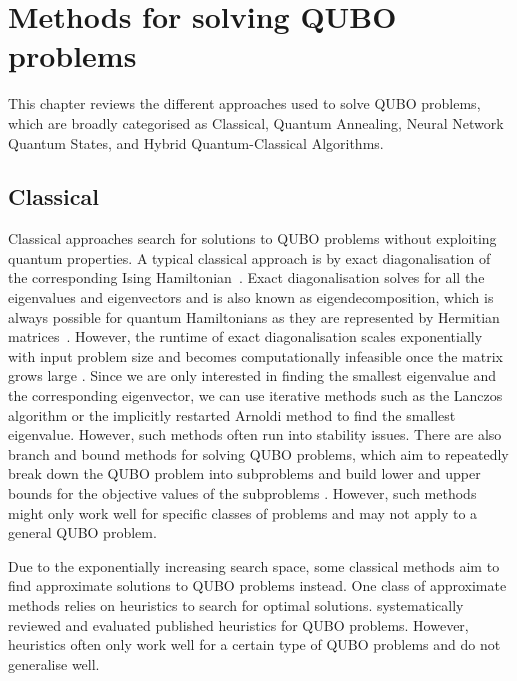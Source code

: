 \chapter{Methods for solving QUBO problems}\label{review}
\vspace{2em}

This chapter reviews the different approaches used to solve QUBO problems, which are broadly categorised as Classical, Quantum Annealing, Neural Network Quantum States, and Hybrid Quantum-Classical Algorithms.

\section{Classical}
Classical approaches search for solutions to QUBO problems without exploiting quantum properties. A typical classical approach is by exact diagonalisation of the corresponding Ising Hamiltonian~\cite{b25}. Exact diagonalisation solves for all the eigenvalues and eigenvectors and is also known as eigendecomposition, which is always possible for quantum Hamiltonians as they are represented by Hermitian matrices~\cite{b27}. However, the runtime of exact diagonalisation scales exponentially with input problem size and becomes computationally infeasible once the matrix grows large \cite{b25}. Since we are only interested in finding the smallest eigenvalue and the corresponding eigenvector, we can use iterative methods such as the Lanczos algorithm \cite{b28} or the implicitly restarted Arnoldi method \cite{b29} to find the smallest eigenvalue. However, such methods often run into stability issues. There are also branch and bound methods for solving QUBO problems, which aim to repeatedly break down the QUBO problem into subproblems and build lower and upper bounds for the objective values of the subproblems \cite{otaki2023experimental}. However, such methods might only work well for specific classes of problems and may not apply to a general QUBO problem.

Due to the exponentially increasing search space, some classical methods aim to find approximate solutions to QUBO problems instead. One class of approximate methods relies on heuristics to search for optimal solutions.  systematically reviewed and evaluated published heuristics for QUBO problems. However, heuristics often only work well for a certain type of QUBO problems and do not generalise well.


